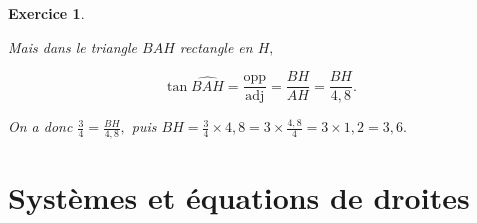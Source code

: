 \documentclass[10pt]{article}
\newtheorem{exo}{Exercice}
\begin{document}
\begin{exo}
\begin{enumerate}
Mais dans le triangle $BAH$ rectangle en $H,$

\[\tan \widehat{BAH}=\frac{\text{opp}}{\text{adj}}=\frac{BH}{AH}=\frac{BH}{4,8}.\]

On a donc $\frac{3}{4}=\frac{BH}{4,8},$ puis $BH=\frac{3}{4}\times 4,8=3\times\frac{4,8}{4}=3\times 1,2=3,6.$
\end{enumerate}


\end{exo}

\setcounter{section}{10}



\section{Systèmes et équations de droites}


\setcounter{exo}{135}
\end{document}
